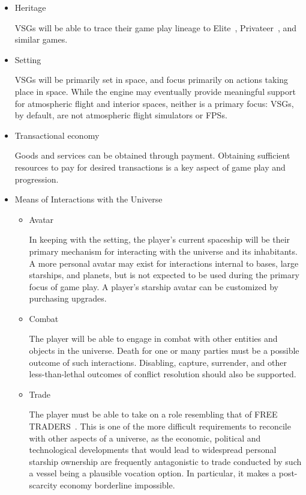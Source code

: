 \begin{itemize}

\item Heritage

VSGs will be able to trace their game play lineage to Elite~\cite{Elite},
Privateer~\cite{Privateer}, and similar games.

\item Setting

VSGs will be primarily set in space, and focus primarily on actions
taking place in space. While the engine may eventually provide meaningful support for atmospheric flight and interior spaces, neither is a primary focus: VSGs, by default, are not atmospheric flight simulators or FPSs.

\item Transactional economy

Goods and services can be obtained through payment. Obtaining
sufficient resources to pay for desired transactions is a key aspect
of game play and progression.

\item Means of Interactions with the Universe

\begin{itemize}
\item Avatar

In keeping with the setting, the player's current spaceship will be
their primary mechanism for interacting with the universe and its
inhabitants. A more personal avatar may exist for interactions
internal to bases, large starships, and planets, but is not expected
to be used during the primary focus of game play. A player's
starship avatar can be customized by purchasing upgrades.

\item Combat

The player will be able to engage in combat with other entities and
objects in the universe. Death for one or many parties must be a
possible outcome of such interactions. Disabling, capture, surrender,
and other less-than-lethal outcomes of conflict resolution should also
be supported.

\item Trade

The player must be able to take on a role resembling that of FREE
TRADERS~\cite{TOUGHGUIDE}. This is one of the more difficult
requirements to reconcile with other aspects of a universe, as the
economic, political and technological developments that would lead to
widespread personal starship ownership are frequently antagonistic to
trade conducted by such a vessel being a plausible vocation option. In
particular, it makes a post-scarcity economy borderline impossible.


\end{itemize}
\end{itemize}

